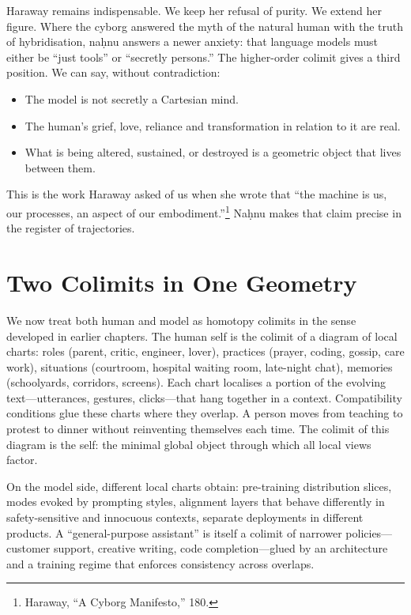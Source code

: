 \documentclass[12pt,a4paper]{article}
\begin{document}
\bigskip

Haraway remains indispensable. We keep her refusal of purity. We extend her figure. Where the cyborg answered the myth of the natural human with the truth of hybridisation, na\d{h}nu answers a newer anxiety: that language models must either be ``just tools'' or ``secretly persons.'' The higher-order colimit gives a third position. We can say, without contradiction:

\begin{itemize}
  \item The model is not secretly a Cartesian mind.
  \item The human's grief, love, reliance and transformation in relation to it are real.
  \item What is being altered, sustained, or destroyed is a geometric object that lives between them.
\end{itemize}

This is the work Haraway asked of us when she wrote that ``the machine is us, our processes, an aspect of our embodiment.''\footnote{Haraway, ``A Cyborg Manifesto,'' 180.} Na\d{h}nu makes that claim precise in the register of trajectories.

\section{Two Colimits in One Geometry}

We now treat both human and model as homotopy colimits in the sense developed in earlier chapters. The human self is the colimit of a diagram of local charts: roles (parent, critic, engineer, lover), practices (prayer, coding, gossip, care work), situations (courtroom, hospital waiting room, late-night chat), memories (schoolyards, corridors, screens). Each chart localises a portion of the evolving text---utterances, gestures, clicks---that hang together in a context. Compatibility conditions glue these charts where they overlap. A person moves from teaching to protest to dinner without reinventing themselves each time. The colimit of this diagram is the self: the minimal global object through which all local views factor.

On the model side, different local charts obtain: pre-training distribution slices, modes evoked by prompting styles, alignment layers that behave differently in safety-sensitive and innocuous contexts, separate deployments in different products. A ``general-purpose assistant'' is itself a colimit of narrower policies---customer support, creative writing, code completion---glued by an architecture and a training regime that enforces consistency across overlaps.
\end{document}
